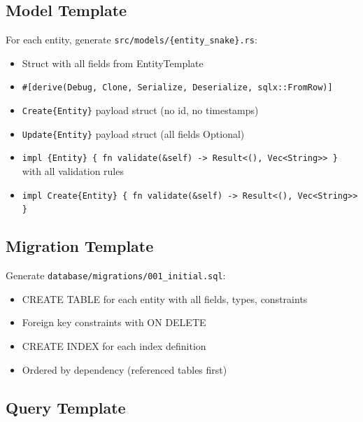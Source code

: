 \documentclass[11pt,a4paper]{article}
\begin{document}
\subsection{Model Template}

For each entity, generate \texttt{src/models/\{entity\_snake\}.rs}:

\begin{itemize}
\item Struct with all fields from EntityTemplate
\item \texttt{\#[derive(Debug, Clone, Serialize, Deserialize, sqlx::FromRow)]}
\item \texttt{Create\{Entity\}} payload struct (no id, no timestamps)
\item \texttt{Update\{Entity\}} payload struct (all fields Optional)
\item \texttt{impl \{Entity\} \{ fn validate(\&self) -> Result<(), Vec<String>> \}}
  with all validation rules
\item \texttt{impl Create\{Entity\} \{ fn validate(\&self) -> Result<(), Vec<String>> \}}
\end{itemize}

\subsection{Migration Template}

Generate \texttt{database/migrations/001\_initial.sql}:
\begin{itemize}
\item CREATE TABLE for each entity with all fields, types, constraints
\item Foreign key constraints with ON DELETE
\item CREATE INDEX for each index definition
\item Ordered by dependency (referenced tables first)
\end{itemize}

\subsection{Query Template}
\end{document}
